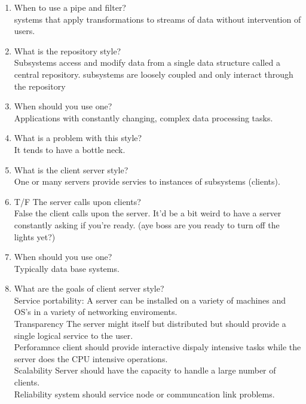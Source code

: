 \documentclass[10pt]{article}
\begin{document}
\begin{enumerate}
      \item When to use a pipe and filter?\\
            systems that apply transformations to streams of data without intervention of users.\\

      \item What is the repository style?\\
            Subsystems access and modify data from a single data structure called a central repository. subsystems are loosely coupled and only interact through the repository\\

      \item When should you use one?\\
            Applications with constantly changing, complex data processing tasks.\\

      \item What is a problem with this style?\\
            It tends to have a bottle neck.\\

      \item What is the client server style?\\
            One or many servers provide servies to instances of subsystems (clients).\\

      \item T/F The server calls upon clients?\\
            False the client calls upon the server. It'd be a bit weird to have a server constantly asking if you're ready. (aye boss are you ready to turn off the lights yet?)\\

      \item When should you use one?\\
            Typically data base systems.\\

      \item What are the goals of client server style?\\
            Service portability: A server can be installed on a variety of machines and OS's in a variety of networking enviroments.\\
            Transparency The server might itself but distributed but should provide a single logical service to the user.\\
            Perforamnce client should provide interactive dispaly intensive tasks while the server does the CPU intensive operations.\\
            Scalability Server should have the capacity to handle a large number of clients.\\
            Reliability system should service node or communcation link problems.\\


\end{enumerate}
\end{document}
